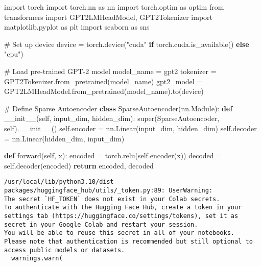 \documentclass[
  letterpaper,
  DIV=11,
  numbers=noendperiod]{scrreprt}
\newenvironment{Shaded}{\begin{snugshade}}{\end{snugshade}}
\newcommand{\BuiltInTok}[1]{\textcolor[rgb]{0.00,0.23,0.31}{#1}}
\newcommand{\CommentTok}[1]{\textcolor[rgb]{0.37,0.37,0.37}{#1}}
\newcommand{\ControlFlowTok}[1]{\textcolor[rgb]{0.00,0.23,0.31}{\textbf{#1}}}
\newcommand{\FunctionTok}[1]{\textcolor[rgb]{0.28,0.35,0.67}{#1}}
\newcommand{\ImportTok}[1]{\textcolor[rgb]{0.00,0.46,0.62}{#1}}
\newcommand{\KeywordTok}[1]{\textcolor[rgb]{0.00,0.23,0.31}{\textbf{#1}}}
\newcommand{\NormalTok}[1]{\textcolor[rgb]{0.00,0.23,0.31}{#1}}
\newcommand{\OperatorTok}[1]{\textcolor[rgb]{0.37,0.37,0.37}{#1}}
\newcommand{\StringTok}[1]{\textcolor[rgb]{0.13,0.47,0.30}{#1}}
\newcommand{\VariableTok}[1]{\textcolor[rgb]{0.07,0.07,0.07}{#1}}
\begin{document}
\begin{Shaded}
\begin{Highlighting}[]
\ImportTok{import}\NormalTok{ torch}
\ImportTok{import}\NormalTok{ torch.nn }\ImportTok{as}\NormalTok{ nn}
\ImportTok{import}\NormalTok{ torch.optim }\ImportTok{as}\NormalTok{ optim}
\ImportTok{from}\NormalTok{ transformers }\ImportTok{import}\NormalTok{ GPT2LMHeadModel, GPT2Tokenizer}
\ImportTok{import}\NormalTok{ matplotlib.pyplot }\ImportTok{as}\NormalTok{ plt}
\ImportTok{import}\NormalTok{ seaborn }\ImportTok{as}\NormalTok{ sns}

\CommentTok{\# Set up device}
\NormalTok{device }\OperatorTok{=}\NormalTok{ torch.device(}\StringTok{"cuda"} \ControlFlowTok{if}\NormalTok{ torch.cuda.is\_available() }\ControlFlowTok{else} \StringTok{"cpu"}\NormalTok{)}

\CommentTok{\# Load pre{-}trained GPT{-}2 model}
\NormalTok{model\_name }\OperatorTok{=} \StringTok{\textquotesingle{}gpt2\textquotesingle{}}
\NormalTok{tokenizer }\OperatorTok{=}\NormalTok{ GPT2Tokenizer.from\_pretrained(model\_name)}
\NormalTok{gpt2\_model }\OperatorTok{=}\NormalTok{ GPT2LMHeadModel.from\_pretrained(model\_name).to(device)}

\CommentTok{\# Define Sparse Autoencoder}
\KeywordTok{class}\NormalTok{ SparseAutoencoder(nn.Module):}
    \KeywordTok{def} \FunctionTok{\_\_init\_\_}\NormalTok{(}\VariableTok{self}\NormalTok{, input\_dim, hidden\_dim):}
        \BuiltInTok{super}\NormalTok{(SparseAutoencoder, }\VariableTok{self}\NormalTok{).}\FunctionTok{\_\_init\_\_}\NormalTok{()}
        \VariableTok{self}\NormalTok{.encoder }\OperatorTok{=}\NormalTok{ nn.Linear(input\_dim, hidden\_dim)}
        \VariableTok{self}\NormalTok{.decoder }\OperatorTok{=}\NormalTok{ nn.Linear(hidden\_dim, input\_dim)}

    \KeywordTok{def}\NormalTok{ forward(}\VariableTok{self}\NormalTok{, x):}
\NormalTok{        encoded }\OperatorTok{=}\NormalTok{ torch.relu(}\VariableTok{self}\NormalTok{.encoder(x))}
\NormalTok{        decoded }\OperatorTok{=} \VariableTok{self}\NormalTok{.decoder(encoded)}
        \ControlFlowTok{return}\NormalTok{ encoded, decoded}

\end{Highlighting}
\end{Shaded}

\begin{verbatim}
/usr/local/lib/python3.10/dist-packages/huggingface_hub/utils/_token.py:89: UserWarning: 
The secret `HF_TOKEN` does not exist in your Colab secrets.
To authenticate with the Hugging Face Hub, create a token in your settings tab (https://huggingface.co/settings/tokens), set it as secret in your Google Colab and restart your session.
You will be able to reuse this secret in all of your notebooks.
Please note that authentication is recommended but still optional to access public models or datasets.
  warnings.warn(
\end{verbatim}
\end{document}
